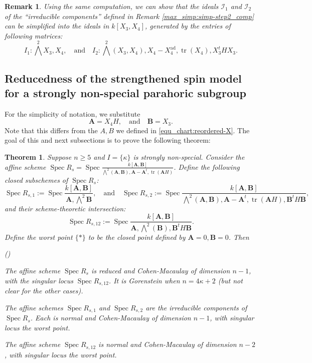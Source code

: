 \documentclass[pdflatex,sn-mathphys-num]{sn-jnl}%
\theoremstyle{thmstyleone}%
\newtheorem{theorem}[subsubsection]{Theorem}%
\theoremstyle{thmstyletwo}%
\newtheorem{remark}[subsubsection]{Remark}%
\numberwithin{equation}{subsection}
\theoremstyle{thmstylethree}%
\newcommand{\bA}{\ensuremath{\mathbf{A}}\xspace}
\newcommand{\bB}{\ensuremath{\mathbf{B}}\xspace}
\newcommand{\CI}{\ensuremath{\mathcal{I}}\xspace}
\newcommand{\ad}{\mathrm{ad}}
\DeclareMathOperator{\Spec}{Spec}
\DeclareMathOperator{\tr}{tr}
\newenvironment{altenumerate}
	{\begin{list}
			{(\theenumi) }
			{\usecounter{enumi}
				\setlength{\labelwidth}{0pt}
				\setlength{\labelsep}{0pt}
				\setlength{\leftmargin}{0pt}
				\setlength{\itemsep}{\the\smallskipamount}
				\renewcommand{\theenumi}{\roman{enumi}}
		}}
		{\end{list}}
\begin{document}
\begin{remark}\label{max_simp:simp-step2-simp-comp}
Using the same computation, we can show that the ideals $\CI_1$ and $\CI_2$ of the ``irreducible components'' defined in Remark \ref{max_simp:simp-step2_comp} can be simplified into the ideals in $k[X_3, X_4]$, generated by the entries of following matrices:
\begin{equation*}
    I_1:\bigwedge^2 X_3, X_4,
    \quad\text{and}\quad
    I_2: \bigwedge^2(X_3,X_4),X_4-X_4^\ad,\tr(X_4),X_3^tHX_3.
\end{equation*}
\end{remark}
		
\subsection{Reducedness of the strengthened spin model for a strongly non-special parahoric subgroup}\label{max_red}
For the simplicity of notation, we substitute 
\begin{equation}\label{max_red:sub}
    \bA=X_4 H,\quad\text{and}\quad \bB=X_3.
\end{equation}
Note that this differs from the $A, B$ we defined in \eqref{equ_chart:reordered-X}. The goal of this and next subsections is to prove the following theorem:
\begin{theorem}\label{max_red:reduced_sym}
Suppose $n\geq 5$ and $I=\{\kappa\}$ is strongly non-special. Consider the affine scheme $\Spec R_s=\Spec \frac{k[\bA,\bB]}{\bigwedge^2(\bA,\bB),\bA-\bA^t,\tr(\bA H)}$. Define the following closed subschemes of $\Spec R_s$:
\begin{equation*}
		\Spec R_{s,1}:=\Spec\frac{k[\bA,\bB]}{\bA,\bigwedge^2 \bB},
		\quad\text{and}\quad
		\Spec R_{s,2}:=\Spec \frac{k[\bA,\bB]}{\bigwedge^2(\bA,\bB),\bA-\bA^t,\tr(\bA H),\bB^tH\bB},
\end{equation*}
and their scheme-theoretic intersection:
\begin{equation*}
		\Spec R_{s,12}:=\Spec \frac{k[\bA,\bB]}{\bA,\bigwedge^2(\bB),\bB^tH\bB}.
\end{equation*}
Define the worst point $\{*\}$ to be the closed point defined by $\bA=0,\bB=0$. Then
\begin{altenumerate}
    \item The affine scheme $\Spec R_s$ is reduced and Cohen-Macaulay of dimension $n-1$, with the singular locus $\Spec R_{s,12}$. It is Gorenstein when $n=4\kappa+2$ (but not clear for the other cases).
    
    \item The affine schemes $\Spec R_{s,1}$ and $\Spec R_{s,2}$ are the irreducible components of $\Spec R_s$. Each is normal and Cohen-Macaulay of dimension $n-1$, with singular locus the worst point.
    \item The affine scheme $\Spec R_{s,12}$ is normal and Cohen-Macaulay of dimension $n-2$, with singular locus the worst point.
\end{altenumerate}

\end{theorem}
\end{document}
